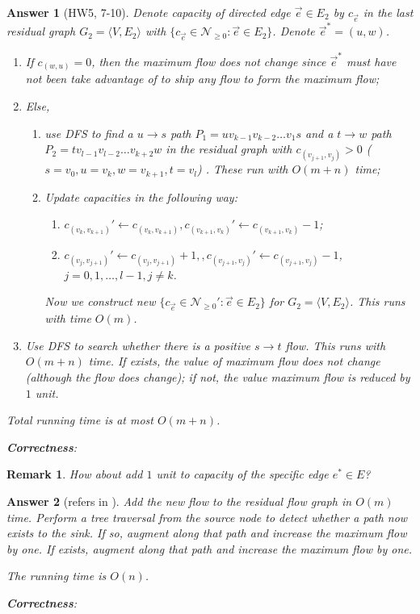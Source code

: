 \documentclass[11pt]{article}
\theoremstyle{numberplain}
\theoremstyle{nonumberplain}
\newtheorem{rem}{Remark}
\newtheorem{ans}{Answer}
\newcommand{\0}{{\mathbf{0}}}
\begin{document}
\begin{ans}[HW5, 7-10] Denote capacity of directed edge $\vec{e} \in E_2$ by $c_{\vec{e}}$ in the last residual graph $G_2=\langle V,E_2\rangle $ with $\{c_{\vec{e}}\in \mathcal{N}_{\geq 0}:\vec{e}\in E_2\}$. Denote  $\vec{e}^*=(u,w)$.  
\begin{enumerate}
\item If $c_{(w,u)}=0$, then the maximum flow does not change since $\vec{e}^*$ must have not been take advantage of to ship any flow to form the maximum flow;
\item Else, 
\begin{enumerate}
\item use DFS to find a $u\rightarrow s$ path $P_1=uv_{k-1}v_{k-2}\ldots v_1s$ and a $t\rightarrow w$ path $P_2=tv_{l-1}v_{l-2}\ldots v_{k+2}w$ in the residual graph with $c_{(v_{j+1},v_j)}>0$ ($s=v_0,u=v_k,w=v_{k+1},t=v_l$) . These run with $O(m+n)$ time;
\item Update capacities in the following way:
\begin{enumerate}
\item $c_{(v_{k},v_{k+1})}'\leftarrow c_{(v_{k},v_{k+1})}, c_{(v_{k+1},v_k)}'\leftarrow c_{(v_{k+1},v_k)}-1$;
\item $c_{(v_{j},v_{j+1})}'\leftarrow c_{(v_{j},v_{j+1})}+1,, c_{(v_{j+1},v_j)}'\leftarrow c_{(v_{j+1},v_j)}-1$, $j=0,1,\ldots,l-1,j\neq k$.
\end{enumerate}
Now we construct new $\{c_{\vec{e}}\in \mathcal{N}_{\geq 0}':\vec{e}\in E_2\}$ for $G_2=\langle V,E_2\rangle $. This runs with time $O(m)$.
\end{enumerate}
\item Use DFS to search whether there is a positive $s\rightarrow t$ flow. This runs with $O(m+n)$ time. If exists, the value of maximum flow does not change (although the flow does change); if not, the value maximum flow is reduced by $1$ unit.
\end{enumerate}\par 
Total running time is at most $O(m+n)$.\par 
\textbf{Correctness}:
\end{ans}
\begin{rem} How about add $1$ unit to capacity of the  	specific edge $e^*\in E$?
\end{rem}
\begin{ans}[refers in \cite{mit2004springcs}] Add the new flow to the residual flow graph in $O(m)$ time. Perform a tree traversal from the source node to detect whether a path now exists to the sink. If so, augment along that path and increase the maximum ﬂow by one. If exists, augment along that path and increase the maximum ﬂow by one.
\par
The running time is $O(n)$.
\par
\textbf{Correctness}:	
\end{ans}
\end{document}
